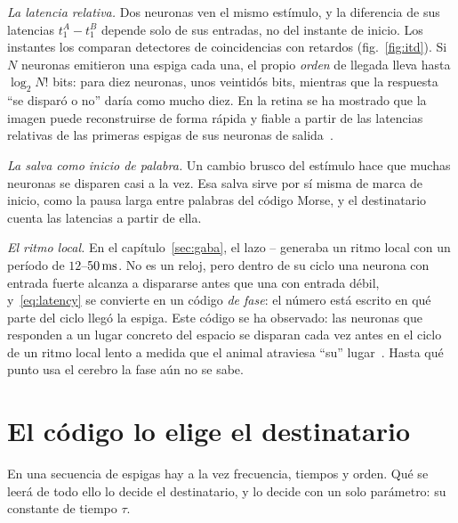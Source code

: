 \emph{La latencia relativa.} Dos neuronas ven el mismo estímulo, y la diferencia de sus latencias $t_1^A-t_1^B$ depende solo de sus entradas, no del instante de inicio. Los instantes los comparan detectores de coincidencias con retardos (fig.~\ref{fig:itd}). Si $N$ neuronas emitieron una espiga cada una, el propio \emph{orden} de llegada lleva hasta $\log_2N!$ bits: para diez neuronas, unos veintidós bits, mientras que la respuesta “se disparó o no” daría como mucho diez. En la retina se ha mostrado que la imagen puede reconstruirse de forma rápida y fiable a partir de las latencias relativas de las primeras espigas de sus neuronas de salida~\cite{Gollisch2008}.

\emph{La salva como inicio de palabra.} Un cambio brusco del estímulo hace que muchas neuronas se disparen casi a la vez. Esa salva sirve por sí misma de marca de inicio, como la pausa larga entre palabras del código Morse, y el destinatario cuenta las latencias a partir de ella.

\emph{El ritmo local.} En el capítulo~\ref{sec:gaba}, el lazo -- generaba un ritmo local con un período de $12$--$50\,\text{ms}$. No es un reloj, pero dentro de su ciclo una neurona con entrada fuerte alcanza a dispararse antes que una con entrada débil, y~\eqref{eq:latency} se convierte en un código \emph{de fase}: el número está escrito en qué parte del ciclo llegó la espiga. Este código se ha observado: las neuronas que responden a un lugar concreto del espacio se disparan cada vez antes en el ciclo de un ritmo local lento a medida que el animal atraviesa “su” lugar~\cite{OKeefe1993}. Hasta qué punto usa el cerebro la fase aún no se sabe.

\section{El código lo elige el destinatario}

En una secuencia de espigas hay a la vez frecuencia, tiempos y orden. Qué se leerá de todo ello lo decide el destinatario, y lo decide con un solo parámetro: su constante de tiempo $\tau$.

